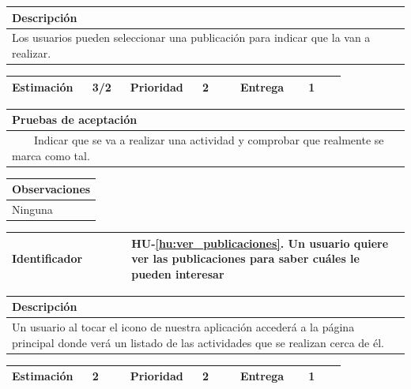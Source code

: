 \documentclass[11pt]{article}
\newcommand{\tabitem}{~~\llap{\textbullet}~~}
\begin{document}
  \begin{longtable}{p{1.028\linewidth}}
    \textbf{Descripción}\\
    \midrule
    Los usuarios pueden seleccionar una publicación para indicar que la van a realizar. 
  \end{longtable}
  \begin{longtable}{p{0.18\linewidth}|p{0.1\linewidth}|p{0.18\linewidth}|p{0.1\linewidth}|p{0.18\linewidth}|p{0.1\linewidth}}
    \toprule
    \textbf{Estimación} & 3/2 & \textbf{Prioridad} & 2 & \textbf{Entrega} & 1 \\
    \bottomrule
  \end{longtable}

  \begin{longtable}{p{1.028\linewidth}}
    \textbf{Pruebas de aceptación}\\
    \midrule
    \tabitem Indicar que se va a realizar una actividad y comprobar que realmente se marca como tal.\\
\end{longtable}
\begin{longtable}{p{1.028\linewidth}}
  \textbf{Observaciones}\\
  \midrule
  Ninguna\\
  \bottomrule
  \bottomrule
\end{longtable}


  \centering
  \begin{longtable}{p{0.3\linewidth}|p{0.7\linewidth}}
    \toprule
    \toprule
    \textbf{Identificador} & \textbf{HU-\ref{hu:ver_publicaciones}}. Un usuario quiere ver las publicaciones para saber cuáles le pueden interesar\\
    
    \bottomrule
  \end{longtable}

  \begin{longtable}{p{1.028\linewidth}}
    \textbf{Descripción}\\
    \midrule
    Un usuario al tocar el icono de nuestra aplicación accederá a la página principal donde verá un listado de las actividades que se realizan cerca de él.
  \end{longtable}
  \begin{longtable}{p{0.18\linewidth}|p{0.1\linewidth}|p{0.18\linewidth}|p{0.1\linewidth}|p{0.18\linewidth}|p{0.1\linewidth}}
    \toprule
    \textbf{Estimación} & 2 & \textbf{Prioridad} & 2 & \textbf{Entrega} & 1 \\
    \bottomrule
  \end{longtable}
\end{document}
